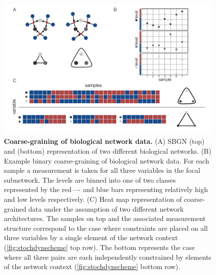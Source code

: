 \begin{figure}[!ht]
\centering
\noindent\includegraphics[width=0.9\columnwidth]{fig/figure_expression_concept.pdf}
\caption{{\bf Coarse-graining of biological network data.} (A) SBGN (top) and \SH{} (bottom) representation of two different biological networks. (B) Example binary coarse-graining of biological network data. For each sample a measurement is taken for all three variables in the focal subnetwork. The levels are binned into one of two classes represented by the red---- and blue bars representing relatively high and low levels respectively. (C) Heat map representation of coarse-grained data under the assumption of two different network architectures. The samples on top and the associated measurement structure correspond to the case where constraints are placed on all three variables by a single element of the network context (\ref{fig:stochdynscheme} top row). The bottom represents the case where all three pairs are each independently constrained by elements of the network context (\ref{fig:stochdynscheme} bottom row).}
\label{fig:expression_concept}
\end{figure}

